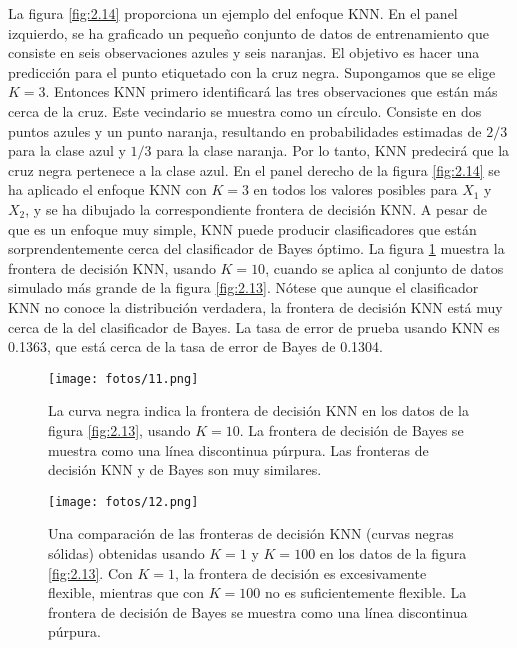 La figura \ref{fig:2.14} proporciona un ejemplo del enfoque KNN. En el panel izquierdo, se ha graficado un pequeño conjunto de datos de entrenamiento que consiste en seis observaciones azules y seis naranjas. El objetivo es hacer una predicción para el punto etiquetado con la cruz negra. Supongamos que se elige $K = 3$. Entonces KNN primero identificará las tres observaciones que están más cerca de la cruz. Este vecindario se muestra como un círculo. Consiste en dos puntos azules y un punto naranja, resultando en probabilidades estimadas de $2/3$ para la clase azul y $1/3$ para la clase naranja. Por lo tanto, KNN predecirá que la cruz negra pertenece a la clase azul. En el panel derecho de la figura \ref{fig:2.14} se ha aplicado el enfoque KNN con $K = 3$ en todos los valores posibles para $X_1$ y $X_2$, y se ha dibujado la correspondiente frontera de decisión KNN. A pesar de que es un enfoque muy simple, KNN puede producir clasificadores que están sorprendentemente cerca del clasificador de Bayes óptimo. La figura \ref{fig:2.15} muestra la frontera de decisión KNN, usando $K = 10$, cuando se aplica al conjunto de datos simulado más grande de la figura \ref{fig:2.13}. Nótese que aunque el clasificador KNN no conoce la distribución verdadera, la frontera de decisión KNN está muy cerca de la del clasificador de Bayes. La tasa de error de prueba usando KNN es 0.1363, que está cerca de la tasa de error de Bayes de 0.1304. \\

\begin{figure}[H]
\centering
\texttt{[image: fotos/11.png]}
\caption{La curva negra indica la frontera de decisión KNN en los datos de la figura \ref{fig:2.13}, usando $K = 10$. La frontera de decisión de Bayes se muestra como una línea discontinua púrpura. Las fronteras de decisión KNN y de Bayes son muy similares.}
\label{fig:2.15}
\end{figure}

\begin{figure}[H]
\centering
\texttt{[image: fotos/12.png]}
\caption{Una comparación de las fronteras de decisión KNN (curvas negras sólidas) obtenidas usando $K = 1$ y $K = 100$ en los datos de la figura \ref{fig:2.13}. Con $K = 1$, la frontera de decisión es excesivamente flexible, mientras que con $K = 100$ no es suficientemente flexible. La frontera de decisión de Bayes se muestra como una línea discontinua púrpura.}
\label{fig:2.16}
\end{figure}

